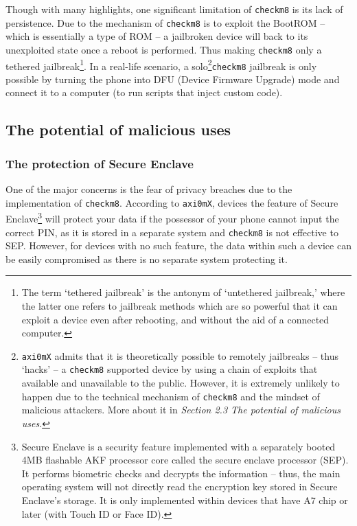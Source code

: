 \documentclass[10pt]{article}
\newcommand{\inlinecode}{\texttt}
\begin{document}
Though with many highlights, one significant limitation of \inlinecode{checkm8} is its lack of persistence. Due to the mechanism of \inlinecode{checkm8} is to exploit the BootROM -- which is essentially a type of ROM -- a jailbroken device will back to its unexploited state once a reboot is performed. Thus making \inlinecode{checkm8} only a tethered jailbreak\footnote{The term `tethered jailbreak' is the antonym of `untethered jailbreak,' where the latter one refers to jailbreak methods which are so powerful that it can exploit a device even after rebooting, and without the aid of a connected computer.}. In a real-life scenario, a solo\footnote{\inlinecode{axi0mX} admits that it is theoretically possible to remotely jailbreaks -- thus `hacks' -- a \inlinecode{checkm8} supported device by using a chain of exploits that available and unavailable to the public. However, it is extremely unlikely to happen due to the technical mechanism of \inlinecode{checkm8} and the mindset of malicious attackers. More about it in \textit{Section 2.3 The potential of malicious uses}.}\inlinecode{checkm8} jailbreak is only possible by turning the phone into DFU (Device Firmware Upgrade) mode and connect it to a computer (to run scripts that inject custom code).

\subsection{The potential of malicious uses}
\subsubsection{The protection of Secure Enclave}
One of the major concerns is the fear of privacy breaches due to the implementation of \inlinecode{checkm8}. According to \inlinecode{axi0mX}, devices the feature of Secure Enclave\footnote{Secure Enclave is a security feature implemented with a separately booted 4MB flashable AKF processor core called the secure enclave processor (SEP). It performs biometric checks and decrypts the information -- thus, the main operating system will not directly read the encryption key stored in Secure Enclave's storage. It is only implemented within devices that have A7 chip or later (with Touch ID or Face ID).} will protect your data if the possessor of your phone cannot input the correct PIN, as it is stored in a separate system and \inlinecode{checkm8} is not effective to SEP. However, for devices with no such feature, the data within such a device can be easily compromised as there is no separate system protecting it.
\end{document}
